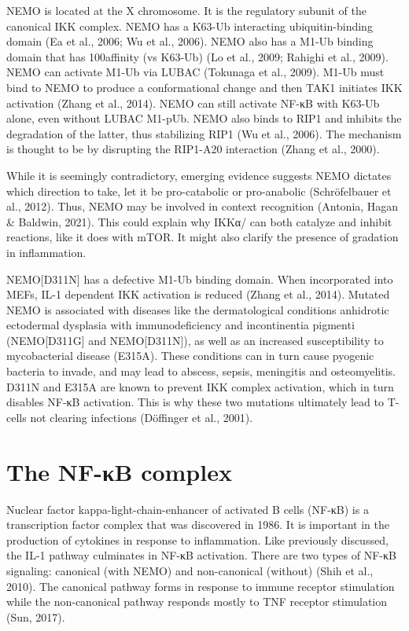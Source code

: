 NEMO is located at the X chromosome. It is the regulatory subunit of the canonical IKK complex. NEMO has a K63-Ub interacting ubiquitin-binding domain (Ea et al., 2006; Wu et al., 2006). NEMO also has a M1-Ub binding domain that has 100\times affinity (vs K63-Ub) (Lo et al., 2009; Rahighi et al., 2009). NEMO can activate M1-Ub via LUBAC (Tokunaga et al., 2009). M1-Ub must bind to NEMO to produce a conformational change and then TAK1 initiates IKK{\textbeta} activation (Zhang et al., 2014). NEMO can still activate NF-κB with K63-Ub alone, even without LUBAC M1-pUb. NEMO also binds to RIP1 and inhibits the degradation of the latter, thus stabilizing RIP1 (Wu et al., 2006). The mechanism is thought to be by disrupting the RIP1-A20 interaction (Zhang et al., 2000).

While it is seemingly contradictory, emerging evidence suggests NEMO dictates which direction to take, let it be pro-catabolic or pro-anabolic (Schröfelbauer et al., 2012). Thus, NEMO may be involved in context recognition (Antonia, Hagan \& Baldwin, 2021). This could explain why IKKα/{\textbeta} can both catalyze and inhibit reactions, like it does with mTOR. It might also clarify the presence of gradation in inflammation. 

NEMO[D311N] has a defective M1-Ub binding domain. When incorporated into MEFs, IL-1 dependent IKK activation is reduced (Zhang et al., 2014). Mutated NEMO is associated with diseases like the dermatological conditions anhidrotic ectodermal dysplasia with immunodeficiency and incontinentia pigmenti (NEMO[D311G] and NEMO[D311N]), as well as an increased susceptibility to mycobacterial disease (E315A). These conditions can in turn cause pyogenic bacteria to invade, and may lead to abscess, sepsis, meningitis and osteomyelitis. D311N and E315A are known to prevent IKK complex activation, which in turn disables NF-κB activation. This is why these two mutations ultimately lead to T-cells not clearing infections (Döffinger et al., 2001).

\section{The NF-κB complex}
\label{section:NFkB}
Nuclear factor kappa-light-chain-enhancer of activated B cells (NF-κB) is a transcription factor complex that was discovered in 1986. It is important in the production of cytokines in response to inflammation. Like previously discussed, the IL-1 pathway culminates in NF-κB activation. There are two types of NF-κB signaling: canonical (with NEMO) and non-canonical (without) (Shih et al., 2010). The canonical pathway forms in response to immune receptor stimulation while the non-canonical pathway responds mostly to TNF receptor stimulation (Sun, 2017).

